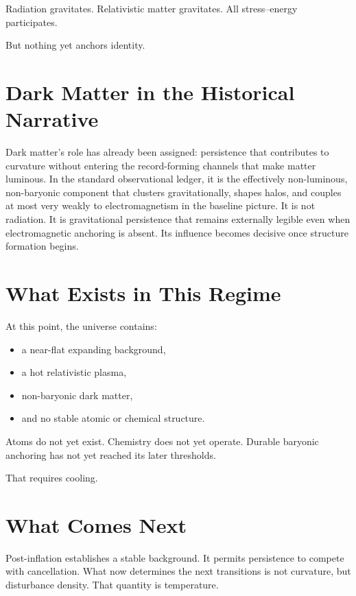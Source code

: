 \documentclass[11pt,twoside,openright]{book}
\begin{document}
Radiation gravitates. Relativistic matter gravitates. All stress--energy participates.

But nothing yet anchors identity.

\section*{Dark Matter in the Historical Narrative}

Dark matter's role has already been assigned: persistence that contributes to curvature without entering the record-forming channels that make matter luminous. In the standard observational ledger, it is the effectively non-luminous, non-baryonic component that clusters gravitationally, shapes halos, and couples at most very weakly to electromagnetism in the baseline picture. It is not radiation. It is gravitational persistence that remains externally legible even when electromagnetic anchoring is absent. Its influence becomes decisive once structure formation begins.

\section*{What Exists in This Regime}

At this point, the universe contains:

\begin{itemize}
\item a near-flat expanding background,
\item a hot relativistic plasma,
\item non-baryonic dark matter,
\item and no stable atomic or chemical structure.
\end{itemize}

Atoms do not yet exist. Chemistry does not yet operate. Durable baryonic anchoring has not yet reached its later thresholds.

That requires cooling.

\section*{What Comes Next}

Post-inflation establishes a stable background. It permits persistence to compete with cancellation. What now determines the next transitions is not curvature, but disturbance density. That quantity is temperature.
\end{document}
